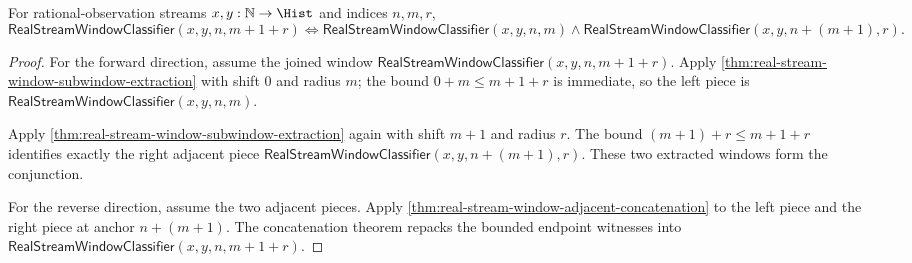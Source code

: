 \begin{theorem}
\label{thm:real-stream-window-adjacent-partition}
For rational-observation streams $x,y:\mathbb{N}\to\Hist$ and indices
$n,m,r$,
$$
\mathsf{RealStreamWindowClassifier}(x,y,n,m+1+r)
\Longleftrightarrow
\mathsf{RealStreamWindowClassifier}(x,y,n,m)\land
\mathsf{RealStreamWindowClassifier}(x,y,n+(m+1),r).
$$
\end{theorem}
\begin{proof}
For the forward direction, assume the joined window
$\mathsf{RealStreamWindowClassifier}(x,y,n,m+1+r)$. Apply
\autoref{thm:real-stream-window-subwindow-extraction} with shift $0$ and
radius $m$; the bound $0+m\le m+1+r$ is immediate, so the left piece is
$\mathsf{RealStreamWindowClassifier}(x,y,n,m)$.

Apply \autoref{thm:real-stream-window-subwindow-extraction} again with shift
$m+1$ and radius $r$. The bound $(m+1)+r\le m+1+r$ identifies exactly the
right adjacent piece
$\mathsf{RealStreamWindowClassifier}(x,y,n+(m+1),r)$. These two extracted
windows form the conjunction.

For the reverse direction, assume the two adjacent pieces. Apply
\autoref{thm:real-stream-window-adjacent-concatenation} to the left piece and
the right piece at anchor $n+(m+1)$. The concatenation theorem repacks the
bounded endpoint witnesses into
$\mathsf{RealStreamWindowClassifier}(x,y,n,m+1+r)$.
\end{proof}

